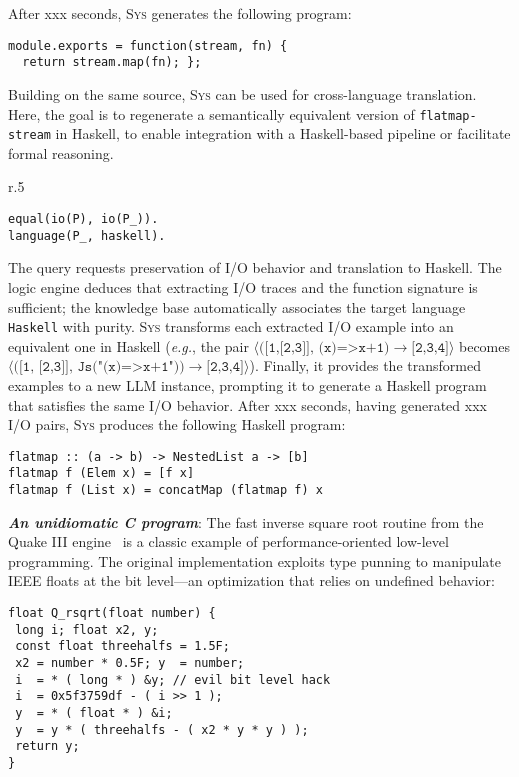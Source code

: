 \documentclass[sigplan]{acmart}
\def\eg{{\em e.g.}, }
\newcommand{\sys}{{\scshape Sys}\xspace}
\newcommand{\heading}[1]{\vspace{2pt}\noindent\textbf{\emph{#1}}:\enspace}
\newcommand{\xxx}{\colorbox{red!30}{xxx}\xspace}
\begin{document}
After \xxx seconds, \sys generates the following program:
\begin{verbatim}
module.exports = function(stream, fn) {
  return stream.map(fn); };
\end{verbatim}


Building on the same source, \sys can be used for cross-language
translation. 
Here, the goal is to regenerate a semantically equivalent version
of \texttt{flatmap-stream} in Haskell, to enable integration with a
Haskell-based pipeline or facilitate formal reasoning.

\begin{wrapfigure}[3]{r}{.5\columnwidth}
\vspace{-10pt}
\begin{verbatim}
equal(io(P), io(P_)).
language(P_, haskell).
\end{verbatim}
\end{wrapfigure}
The query requests preservation of I/O behavior and translation to Haskell. The
logic engine deduces that extracting I/O traces and the function signature is
sufficient; the knowledge base automatically associates the target language
\texttt{Haskell} with purity.
\sys transforms each extracted I/O example into an equivalent one in Haskell (\eg 
the pair $\langle\texttt{([1,[2,3]], (x)=>x+1)}\to\texttt{[2,3,4]}\rangle$ 
becomes $\langle(\texttt{[1, [2,3]], Js("(x)=>x+1"))}\to\texttt{[2,3,4]}\rangle$).
Finally, it provides the transformed examples to a new LLM instance, prompting it
to generate a Haskell program that satisfies the same I/O behavior.
After \xxx seconds, having generated \xxx I/O pairs, \sys produces the following
Haskell program:
\begin{verbatim}
flatmap :: (a -> b) -> NestedList a -> [b]
flatmap f (Elem x) = [f x]
flatmap f (List x) = concatMap (flatmap f) x
\end{verbatim}

\heading{An unidiomatic C program}
The fast inverse square root routine from the Quake III
engine~\cite{fast_inv_sqrt}
is a classic example of performance-oriented low-level programming.
The original implementation exploits type punning to manipulate IEEE
floats at the bit level---an optimization that relies on undefined behavior:

\begin{verbatim}
float Q_rsqrt(float number) {
 long i; float x2, y;
 const float threehalfs = 1.5F;
 x2 = number * 0.5F; y  = number;
 i  = * ( long * ) &y; // evil bit level hack
 i  = 0x5f3759df - ( i >> 1 );
 y  = * ( float * ) &i;
 y  = y * ( threehalfs - ( x2 * y * y ) );
 return y;
}
\end{verbatim}
\end{document}
